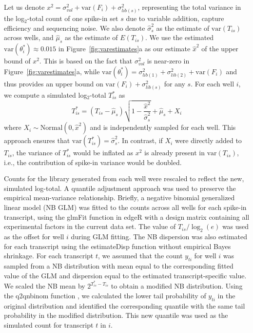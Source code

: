 \documentclass{article}
\newcommand\variance{\mbox{var}}
\begin{document}
Let us denote $x^2 = \sigma^2_{vol} + \variance(F_i) + \sigma^2_{lib(s)}$, representing the total variance in the log$_2$-total count of one spike-in set $s$ due to variable addition, capture efficiency and sequencing noise.
We also denote $\hat\sigma^2_s$ as the estimate of $\variance(T_{is})$ across wells, and $\hat\mu_s$ as the estimate of $E(T_{is})$.
We use the estimated $\variance(\theta^*_i) \approx 0.015$ in Figure~\ref{fig:varestimates}a as our estimate $\hat{x}^2$ of the upper bound of $x^2$.
This is based on the fact that $\sigma^2_{vol}$ is near-zero in Figure~\ref{fig:varestimates}a, while $\variance(\theta^*_i) = \sigma^2_{lib(1)} + \sigma^2_{lib(2)} + \variance(F_i)$ and thus provides an upper bound on $\variance(F_i) + \sigma^2_{lib(s)}$ for any $s$.
For each well $i$, we compute a simulated log$_2$-total $T^*_{is}$ as
\[
    T^*_{is} = (T_{is} - \hat\mu_s)\sqrt{1-\frac{ \hat{x}^2}{\hat\sigma^2_s}} + \hat\mu_s + X_i
\]
where $X_i \sim \mbox{Normal}(0, \hat{x}^2)$ and is independently sampled for each well.
This approach ensures that $\variance(T^*_{is}) = \hat\sigma^2_s$.
In contrast, if $X_i$ were directly added to $T_{is}$, the variance of $T^*_{is}$ would be inflated as $x^2$ is already present in $\variance(T_{is})$, i.e., the contribution of spike-in variance would be doubled.

Counts for the library generated from each well were rescaled to reflect the new, simulated log-total.
A quantile adjustment approach was used to preserve the empirical mean-variance relationship.
Briefly, a negative binomial generalized linear model (NB GLM) was fitted to the counts across all wells for each spike-in transcript, using the glmFit function in edgeR \autocite{mccarthy2012differential, robinson2010edgeR} with a design matrix containing all experimental factors in the current data set.
The value of $T_{is}/\log_2(e)$ was used as the offset for well $i$ during GLM fitting.
The NB dispersion was also estimated for each transcript using the estimateDisp function without empirical Bayes shrinkage.
For each transcript $t$, we assumed that the count $y_{ti}$ for well $i$ was sampled from a NB distribution with mean equal to the corresponding fitted value of the GLM and dispersion equal to the estimated transcript-specific value.
We scaled the NB mean by $2^{T^*_{is} - T_{is}}$ to obtain a modified NB distribution.
Using the q2qnbinom function \autocite{robinson2008small}, we calculated the lower tail probability of $y_{ti}$ in the original distribution and identified the corresponding quantile with the same tail probability in the modified distribution.
This new quantile was used as the simulated count for transcript $t$ in $i$.
\end{document}
